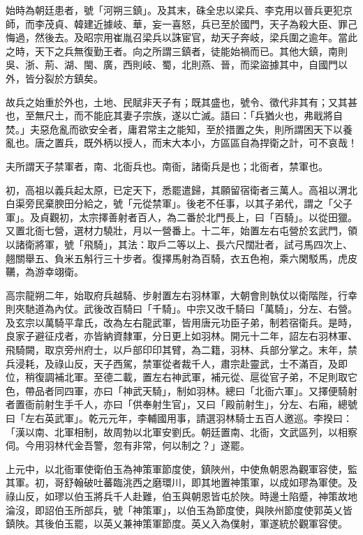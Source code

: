 \begin{pinyinscope}
 始時為朝廷患者，號「河朔三鎮」。及其末，硃全忠以梁兵、李克用以晉兵更犯京師，而李茂貞、韓建近據岐、華，妄一喜怒，兵已至於國門，天子為殺大臣、罪己悔過，然後去。及昭宗用崔胤召梁兵以誅宦官，劫天子奔岐，梁兵圍之逾年。當此之時，天下之兵無復勤王者。向之所謂三鎮者，徒能始禍而已。其他大鎮，南則吳、浙、荊、湖、閩、廣，西則岐、蜀，北則燕、晉，而梁盜據其中，自國門以外，皆分裂於方鎮矣。



 故兵之始重於外也，土地、民賦非天子有；既其盛也，號令、徵代非其有；又其甚也，至無尺土，而不能庇其妻子宗族，遂以亡滅。語曰：「兵猶火也，弗戢將自焚。」夫惡危亂而欲安全者，庸君常主之能知，至於措置之失，則所謂困天下以養亂也。唐之置兵，既外柄以授人，而末大本小，方區區自為捍衛之計，可不哀哉！



 夫所謂天子禁軍者，南、北衙兵也。南衙，諸衛兵是也；北衙者，禁軍也。



 初，高祖以義兵起太原，已定天下，悉罷遣歸，其願留宿衛者三萬人。高祖以渭北白渠旁民棄腴田分給之，號「元從禁軍」。後老不任事，以其子弟代，謂之「父子軍」。及貞觀初，太宗擇善射者百人，為二番於北門長上，曰「百騎」。以從田獵。又置北衙七營，選材力驍壯，月以一營番上。十二年，始置左右屯營於玄武門，領以諸衛將軍，號「飛騎」，其法：取戶二等以上、長六尺闊壯者，試弓馬四次上、翹關舉五、負米五斛行三十步者。復擇馬射為百騎，衣五色袍，乘六閑駁馬，虎皮韉，為游幸翊衛。



 高宗龍朔二年，始取府兵越騎、步射置左右羽林軍，大朝會則執仗以衛階陛，行幸則夾馳道為內仗。武後改百騎曰「千騎」。中宗又改千騎曰「萬騎」，分左、右營。及玄宗以萬騎平韋氏，改為左右龍武軍，皆用唐元功臣子弟，制若宿衛兵。是時，良家子避征戍者，亦皆納資隸軍，分日更上如羽林。開元十二年，詔左右羽林軍、飛騎闕，取京旁州府士，以戶部印印其臂，為二籍，羽林、兵部分掌之。末年，禁兵浸耗，及祿山反，天子西駕，禁軍從者裁千人，肅宗赴靈武，士不滿百，及即位，稍復調補北軍。至德二載，置左右神武軍，補元從、扈從官子弟，不足則取它色，帶品者同四軍，亦曰「神武天騎」，制如羽林。總曰「北衙六軍」。又擇便騎射者置衙前射生手千人，亦曰「供奉射生官」，又曰「殿前射生」，分左、右廂，總號曰「左右英武軍」。乾元元年，李輔國用事，請選羽林騎士五百人邀巡。李揆曰：「漢以南、北軍相制，故周勃以北軍安劉氏。朝廷置南、北衙，文武區列，以相察伺。今用羽林代金吾警，忽有非常，何以制之？」遂罷。



 上元中，以北衙軍使衛伯玉為神策軍節度使，鎮陜州，中使魚朝恩為觀軍容使，監其軍。初，哥舒翰破吐蕃臨洮西之磨環川，即其地置神策軍，以成如璆為軍使。及祿山反，如璆以伯玉將兵千人赴難，伯玉與朝恩皆屯於陜。時邊土陷蹙，神策故地淪沒，即詔伯玉所部兵，號「神策軍」，以伯玉為節度使，與陜州節度使郭英乂皆鎮陜。其後伯玉罷，以英乂兼神策軍節度。英乂入為僕射，軍遂統於觀軍容使。




\end{pinyinscope}
